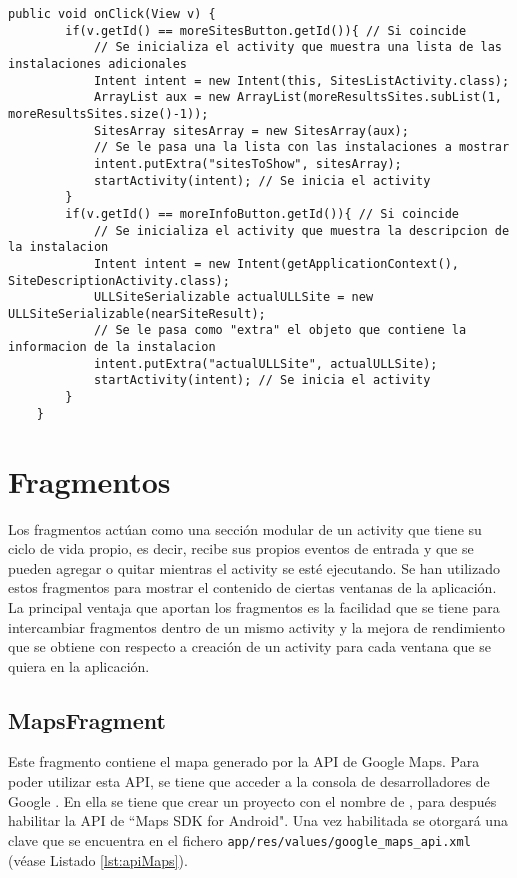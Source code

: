 \begin{lstlisting}[caption={Fichero \texttt{ARNavigation.java}, código para manejar los eventos de los botones.},  label={lst:infobutton}]
    public void onClick(View v) {
        if(v.getId() == moreSitesButton.getId()){ // Si coincide
            // Se inicializa el activity que muestra una lista de las instalaciones adicionales
            Intent intent = new Intent(this, SitesListActivity.class);
            ArrayList aux = new ArrayList(moreResultsSites.subList(1, moreResultsSites.size()-1));
            SitesArray sitesArray = new SitesArray(aux);
            // Se le pasa una la lista con las instalaciones a mostrar
            intent.putExtra("sitesToShow", sitesArray);
            startActivity(intent); // Se inicia el activity
        }
        if(v.getId() == moreInfoButton.getId()){ // Si coincide
            // Se inicializa el activity que muestra la descripcion de la instalacion
            Intent intent = new Intent(getApplicationContext(), SiteDescriptionActivity.class);
            ULLSiteSerializable actualULLSite = new ULLSiteSerializable(nearSiteResult);
            // Se le pasa como "extra" el objeto que contiene la informacion de la instalacion
            intent.putExtra("actualULLSite", actualULLSite);
            startActivity(intent); // Se inicia el activity
        }
    }
\end{lstlisting}

\section{Fragmentos}

Los fragmentos \cite{URL::fragment} actúan como una sección modular de un activity que tiene su ciclo de vida propio, es decir, recibe sus propios eventos de entrada y que se pueden agregar o quitar mientras el activity se esté ejecutando. Se han utilizado estos fragmentos para mostrar el contenido de ciertas ventanas de la aplicación. La principal ventaja que  aportan los fragmentos es la facilidad que se tiene para intercambiar fragmentos dentro de un mismo activity y la mejora de rendimiento que se obtiene con respecto a creación de un activity para cada ventana que se quiera en la aplicación.

\subsection{MapsFragment}
       
Este fragmento contiene el mapa generado por la API de Google Maps. Para poder utilizar esta API, se tiene que acceder a la consola de desarrolladores de Google \cite{URL::consoleGoogle}. En ella se tiene que crear un proyecto con el nombre de \ULLAR{}, para después habilitar la API de ``Maps SDK for Android". Una vez habilitada se otorgará una clave que se encuentra en el fichero \texttt{app/res/values/google\_maps\_api.xml} (véase Listado \ref{lst:apiMaps}).

